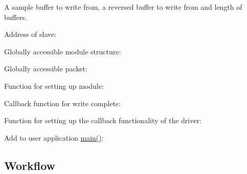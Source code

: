 A sample buffer to write from, a reversed buffer to write from and length of buffers. 
\begin{DoxyCodeInclude}{0}
\end{DoxyCodeInclude}
 Address of slave\+: 
\begin{DoxyCodeInclude}{0}
\end{DoxyCodeInclude}
 Globally accessible module structure\+: 
\begin{DoxyCodeInclude}{0}
\end{DoxyCodeInclude}
 Globally accessible packet\+: 
\begin{DoxyCodeInclude}{0}
\end{DoxyCodeInclude}
 Function for setting up module\+: 
\begin{DoxyCodeInclude}{0}
\end{DoxyCodeInclude}
 Callback function for write complete\+: 
\begin{DoxyCodeInclude}{0}
\end{DoxyCodeInclude}
 Function for setting up the callback functionality of the driver\+: 
\begin{DoxyCodeInclude}{0}
\end{DoxyCodeInclude}
 Add to user application {\ttfamily \mbox{\hyperlink{csc__app_8c_a840291bc02cba5474a4cb46a9b9566fe}{main()}}}\+: 
\begin{DoxyCodeInclude}{0}
\end{DoxyCodeInclude}
 \hypertarget{asfdoc_sam0_sercom_i2c_master_callback_use_case_asfdoc_sam0_sercom_i2c_master_callback_use_case_setup_workflow}{}\subsection{Workflow}\label{asfdoc_sam0_sercom_i2c_master_callback_use_case_asfdoc_sam0_sercom_i2c_master_callback_use_case_setup_workflow}

